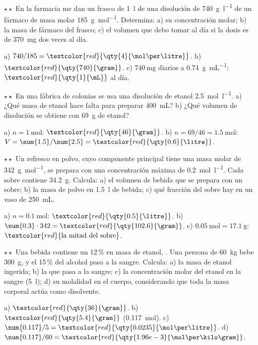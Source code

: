 \begin{exercise}
    \(\star\star\) En la farmacia me dan un frasco de \qty{1}{\litre} de una disolución de \qty{740}{\gram\per\litre} de un fármaco
    de masa molar \qty{185}{\gram\per\mol}. Determina: a) su concentración molar; b) la masa de fármaco del frasco; c) el volumen
    que debo tomar al día si la dosis es de \qty{370}{\milli\gram} dos veces al día.
    \begin{solu}
        a) \(740/185 = \textcolor{red}{\qty{4}{\mol\per\litre}}\). b) \(\textcolor{red}{\qty{740}{\gram}}\).
        c) \(\qty{740}{\milli\gram}\) diarios a \qty{0.74}{\gram\per\mL}: \(\textcolor{red}{\qty{1}{\mL}}\) al día.
    \end{solu}
\end{exercise}

\begin{exercise}
    \(\star\star\) En una fábrica de colonias se usa una disolución de etanol \qty{2.5}{\mol\per\litre}. a) ¿Qué masa de etanol
    hace falta para preparar \qty{400}{\mL}? b) ¿Qué volumen de disolución se obtiene con \qty{69}{\gram} de etanol?
    \begin{solu}
        a) \(n = \qty{1}{\mol}\): \(\textcolor{red}{\qty{46}{\gram}}\). b) \(n = 69/46 = \qty{1.5}{\mol}\): \(V = \num{1.5}/\num{2.5} = \textcolor{red}{\qty{0.6}{\litre}}\).
    \end{solu}
\end{exercise}

\begin{exercise}
    \(\star\star\) Un refresco en polvo, cuyo componente principal tiene una masa molar de \qty{342}{\gram\per\mol}, se prepara con
    una concentración máxima de \qty{0.2}{\mol\per\litre}. Cada sobre contiene \qty{34.2}{\gram}. Calcula: a) el volumen de
    bebida que se prepara con un sobre; b) la masa de polvo en \qty{1.5}{\litre} de bebida; c) qué fracción del sobre hay en un
    vaso de \qty{250}{\mL}.
    \begin{solu}
        a) \(n = \qty{0.1}{\mol}\): \(\textcolor{red}{\qty{0.5}{\litre}}\). b) \(\num{0.3} \cdot 342 = \textcolor{red}{\qty{102.6}{\gram}}\).
        c) \(\qty{0.05}{\mol} = \qty{17.1}{\gram}\): \(\textcolor{red}{\text{la mitad del sobre}}\).
    \end{solu}
\end{exercise}

\begin{exercise}
    \(\star\star\) Una bebida contiene un 12\,\% en masa de etanol, . Una persona de \qty{60}{\kilo\gram} bebe
    \qty{300}{\gram}, y el 15\,\% del alcohol pasa a la sangre. Calcula: a) la masa de etanol ingerida; b) la que pasa a la sangre;
    c) la concentración molar del etanol en la sangre (\qty{5}{\litre}); d) su molalidad en el cuerpo, considerando que toda la
    masa corporal actúa como disolvente.
    \begin{solu}
        a) \(\textcolor{red}{\qty{36}{\gram}}\). b) \(\textcolor{red}{\qty{5.4}{\gram}}\) (\qty{0.117}{\mol}).
        c) \(\num{0.117}/5 = \textcolor{red}{\qty{0.0235}{\mol\per\litre}}\). d) \(\num{0.117}/60 = \textcolor{red}{\qty{1.96e-3}{\mol\per\kilo\gram}}\).
    \end{solu}
\end{exercise}

